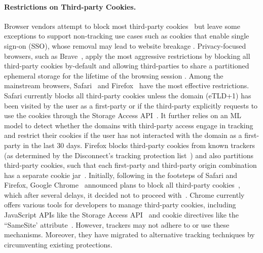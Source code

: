 \vspace{-1mm}
\paragraph{Restrictions on Third-party Cookies.}
%
Browser vendors attempt to block most third-party cookies~\cite{mdnThirdpartyCookiesPrivacy2024} but leave some exceptions to support non-tracking use cases such as cookies that enable single sign-on (SSO), whose removal may lead to website breakage \cite{crouchImprovingPrivacyBreaking2018}. 
%
Privacy-focused browsers, such as Brave~\cite{braveBrowserThatPuts}, apply the most aggressive restrictions by blocking all third-party cookies by-default and allowing third-parties to share a partitioned ephemeral storage for the lifetime of the browsing session \cite{braveprivacyteamEphemeralThirdpartySite2021}. 
%
Among the mainstream browsers, Safari~\cite{appleSafari} and Firefox~\cite{mozillaGetFirefoxBrowser} have the most effective restrictions. 
%
Safari currently blocks all third-party cookies unless the domain (eTLD+1) has been visited by the user as a first-party or if the third-party explicitly requests to use the cookies through the Storage Access API~\cite{TrackingPreventionWebKit2020}. 
%
It further relies on an ML model to detect whether the domains with third-party access engage in tracking and restrict their cookies if the user has not interacted with the domain as a first-party in the last 30 days. 
%
Firefox blocks third-party cookies from known trackers (as determined by the Disconnect's tracking protection list~\cite{disconnectDisconnect}) and also partitions third-party cookies, such that each first-party and third-party origin combination has a separate cookie jar~\cite{mdnThirdpartyCookiesPrivacy2024}.
%
Initially, following in the footsteps of Safari and Firefox, Google Chrome~\cite{googleGoogleChromeFast} announced plans to block all third-party cookies~\cite{chromeBuildingMorePrivate2020}, which after several delays, it decided not to proceed with~\cite{chavezNewPathPrivacy2024}. 
%
Chrome currently offers various tools for developers to manage third-party cookies, including JavaScript APIs like the Storage Access API~\cite{mdnStorageAccessAPI2024} and cookie directives like the ``SameSite' attribute~\cite{mdnSetCookieHTTPMDN2024}. 
%
However, trackers may not adhere to or use these mechanisms. 
%
Moreover, they have migrated to alternative tracking techniques by circumventing existing protections.


